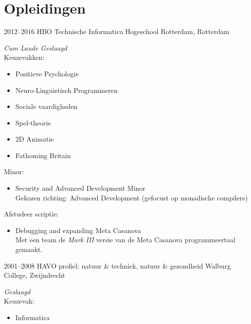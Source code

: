 \documentclass[]{friggeri-cv} %
\begin{document}

\section{Opleidingen}

\begin{entrylist}
   \entry
   {2012--2016}
   {HBO {\normalfont Technische Informatica}}
   {Hogeschool Rotterdam, Rotterdam}
   {\textit{Cum Laude Geslaagd} \\
      Keuzevakken:
      \setlength\multicolsep{0pt}
      \begin{multicols}{2}
         \begin{itemize}[topsep=0pt]
            \item Positieve Psychologie
            \item Neuro-Linguistisch Programmeren
            \item Sociale vaardigheden
            \item Spel-theorie
            \item 2D Animatie
            \item Fathoming Britain
         \end{itemize}
      \end{multicols}
      Minor:
      \begin{itemize}[topsep=0pt]
         \item Security and Advanced Development Minor\\
            Gekozen richting: Advanced Development (gefocust op monadische compilers)\\
      \end{itemize}
      Afstudeer scriptie:
      \begin{itemize}[topsep=0pt]
         \item Debugging and expanding Meta Casanova\\
            Met een team de \textit{Mark III} versie van de Meta Casanova programmeertaal gemaakt.
      \end{itemize}
   }
   \entry
   {2001--2008}
   {HAVO {\normalfont profiel: natuur \& techniek, natuur \& gezondheid}}
   {Walburg College, Zwijndrecht}
   {\textit{Geslaagd} \\
      Keuzevak:
      \begin{itemize}[topsep=0pt]
         \item Informatica
      \end{itemize}
   }
\end{entrylist}
\end{document}
